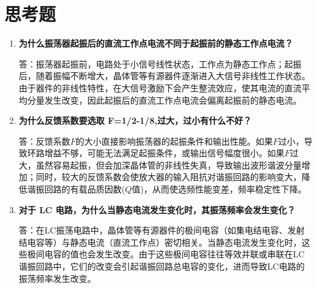 \documentclass[12pt]{article}
\begin{document}
\section{思考题}
\begin{enumerate}
	\item \textbf{为什么振荡器起振后的直流工作点电流不同于起振前的静态工作点电流？}

	      答：振荡器起振前，电路处于小信号线性状态，工作点为静态工作点；起振后，随着振幅不断增大，晶体管等有源器件逐渐进入大信号非线性工作状态。由于器件的非线性特性，在大信号激励下会产生整流效应，使其电流的直流平均分量发生改变，因此起振后的直流工作点电流会偏离起振前的静态电流。

	\item \textbf{为什么反馈系数要选取 F=1/2-1/8,过大，过小有什么不好？}

	      答：反馈系数$F$的大小直接影响振荡器的起振条件和输出性能。如果$F$过小，导致环路增益不够，可能无法满足起振条件，或输出信号幅度很小。如果$F$过大，虽然容易起振，但会加深晶体管的非线性失真，导致输出波形谐波分量增加；同时，较大的反馈系数会使放大器的输入阻抗对谐振回路的影响变大，降低谐振回路的有载品质因数($Q$值)，从而使选频性能变差，频率稳定性下降。

	\item \textbf{对于 LC 电路，为什么当静态电流发生变化时，其振荡频率会发生变化？}

	      答：在LC振荡电路中，晶体管等有源器件的极间电容（如集电结电容、发射结电容等）与静态电流（直流工作点）密切相关。当静态电流发生变化时，这些极间电容的值也会发生改变。由于这些极间电容往往等效并联或串联在LC谐振回路中，它们的改变会引起谐振回路总电容的变化，进而导致LC电路的振荡频率发生改变。
\end{enumerate}
\end{document}
